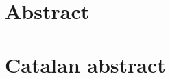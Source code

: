 \chapter*{Abstract}
\thispagestyle{empty}


\newpage
\chapter*{Catalan abstract}
\thispagestyle{empty}

